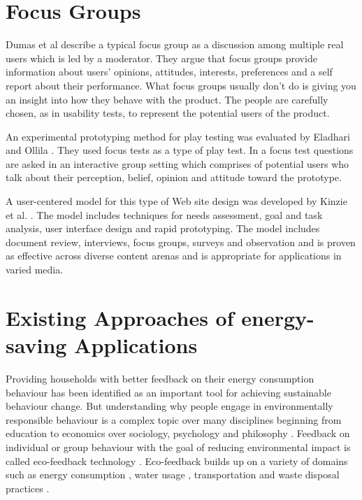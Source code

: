 \section{Focus Groups}

Dumas et al \cite{dumas1999practical} describe a typical focus group as a discussion among multiple real users which is led by a moderator. They argue that focus groups provide information about users' opinions, attitudes, interests, preferences and a self report about their performance. What focus groups usually don't do is giving you an insight into how they behave with the product. The people are carefully chosen, as in usability tests, to represent the potential users of the product.

An experimental prototyping method for play testing was evaluated by Eladhari and Ollila \cite{eladhari2012design}. They used focus tests as a type of play test. In a focus test questions are asked in an interactive group setting which comprises of potential users who talk about their perception, belief, opinion and attitude toward the prototype.

A user-centered model for this type of Web site design was developed by Kinzie et al. \cite{kinzie2002user}. The model includes techniques for needs assessment, goal and task analysis, user interface design and rapid prototyping. The model includes document
review, interviews, focus groups, surveys and observation and is proven as effective across diverse content arenas and is appropriate for applications in varied media.

\section{Existing Approaches of energy-saving Applications}
\label{sec:approaches}

Providing households with better feedback on their energy consumption behaviour has been identified as an important tool for achieving sustainable behaviour change. But understanding why people engage in environmentally responsible behaviour is a complex topic over many disciplines beginning from education to economics over sociology, psychology and philosophy \cite{froehlich2010design}. Feedback on individual or group behaviour with the goal of reducing environmental impact is called eco-feedback technology \cite{mccalley1998computer, holstius2004infotropism, froehlich2010design}. Eco-feedback builds up on a variety of domains such as energy consumption \cite{holmes2007eco}, water usage \cite{arroyo2005waterbot}, transportation \cite{froehlich2009ubigreen, tulusan2012providing} and waste disposal practices \cite{holstius2004infotropism}.

